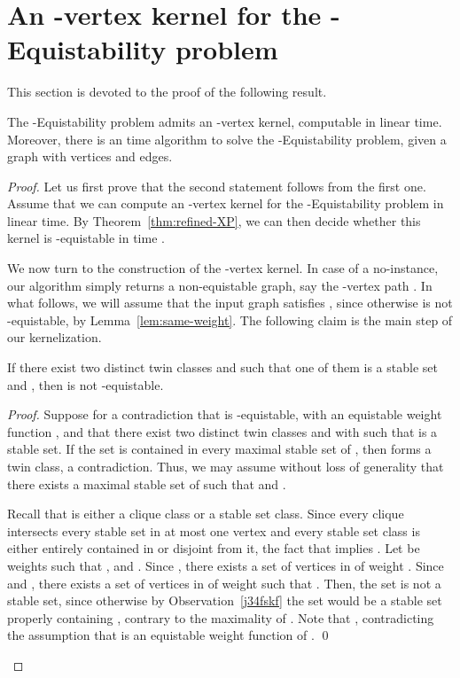 \documentclass{llncs}
\begin{document}
\section{An -vertex kernel for the {\sc -Equistability} problem}\label{sec:k-equi}

This section is devoted to the proof of the following result.

\begin{theorem}\label{thm:k-equistable-fpt}
The {\sc -Equistability} problem admits an -vertex kernel, computable in linear time.
Moreover, there is an  time algorithm to solve the {\sc -Equistability} problem, given a graph with  vertices and  edges.
\end{theorem}

\begin{proof}
Let us first prove that the second statement follows from the first one. Assume that we can compute an -vertex kernel for the {\sc -Equistability} problem in linear time. By Theorem~\ref{thm:refined-XP}, we can then decide whether this kernel is -equistable in time .

We now turn to the construction of the -vertex kernel.
In case of a no-instance, our algorithm simply returns a non-equistable graph, say the -vertex path .
In what follows, we will assume that the input graph  satisfies , since otherwise  is not -equistable, by Lemma~\ref{lem:same-weight}.
The following claim is the main step of our kernelization.

\begin{Claim}\label{clm:big-classes}
If there exist
two distinct twin classes  and  such that
one of them is a stable set and ,
then  is not -equistable.
\end{Claim}

\begin{proof}
Suppose for a contradiction that  is -equistable, with an equistable weight function , and that there exist
two distinct twin classes  and  with  such that  is a stable set.
If the set  is contained in every maximal stable set of , then  forms a twin class, a contradiction.
Thus, we may assume without loss of generality that there exists a maximal stable set  of 
such that  and .

Recall that  is either a clique class or a stable set class.
Since every clique intersects every stable set in at most one vertex
and every stable set class is either entirely contained in  or disjoint from it,
the fact that  implies .
Let  be weights such that , and
. Since , there exists a set  of  vertices in  of weight .
Since  and , there exists a set  of  vertices in  of weight  such that
. Then, the set  is not a stable set, since
otherwise by Observation~\ref{j34fskf} the set  would be a stable set properly containing , contrary to the  maximality of .
Note that , contradicting the assumption that  is an equistable weight function of .
\qed \end{proof}


\end{proof}
\end{document}
